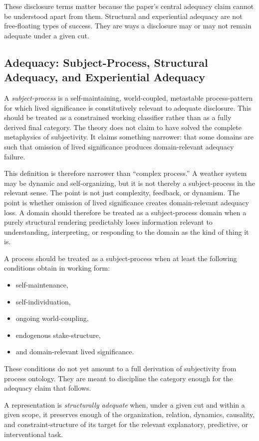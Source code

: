 \documentclass[11pt]{article}
\renewcommand{\emph}[1]{\textit{#1}}
\begin{document}
These disclosure terms matter because the paper's central adequacy claim cannot be understood apart from them. Structural and experiential adequacy are not free-floating types of success. They are ways a disclosure may or may not remain adequate under a given cut.

\subsection{Adequacy: Subject-Process, Structural Adequacy, and Experiential Adequacy}

A \emph{subject-process} is a self-maintaining, world-coupled, metastable process-pattern for which lived significance is constitutively relevant to adequate disclosure. This should be treated as a constrained working classifier rather than as a fully derived final category. The theory does not claim to have solved the complete metaphysics of subjectivity. It claims something narrower: that some domains are such that omission of lived significance produces domain-relevant adequacy failure.

This definition is therefore narrower than ``complex process.'' A weather system may be dynamic and self-organizing, but it is not thereby a subject-process in the relevant sense. The point is not just complexity, feedback, or dynamism. The point is whether omission of lived significance creates domain-relevant adequacy loss. A domain should therefore be treated as a subject-process domain when a purely structural rendering predictably loses information relevant to understanding, interpreting, or responding to the domain as the kind of thing it is.

A process should be treated as a subject-process when at least the following conditions obtain in working form:
\begin{itemize}
    \item self-maintenance,
    \item self-individuation,
    \item ongoing world-coupling,
    \item endogenous stake-structure,
    \item and domain-relevant lived significance.
\end{itemize}

These conditions do not yet amount to a full derivation of subjectivity from process ontology. They are meant to discipline the category enough for the adequacy claim that follows.

A representation is \emph{structurally adequate} when, under a given cut and within a given scope, it preserves enough of the organization, relation, dynamics, causality, and constraint-structure of its target for the relevant explanatory, predictive, or interventional task.
\end{document}
